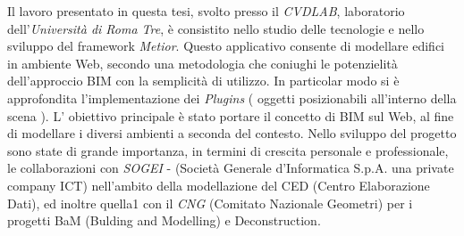 Il lavoro presentato in questa tesi, svolto presso il \emph{CVDLAB},
laboratorio dell'\emph{Università di Roma Tre}, è consistito nello studio delle tecnologie e nello sviluppo del
framework \emph{Metior}.
Questo applicativo consente di modellare edifici in ambiente Web, secondo una metodologia che coniughi le potenzielità
dell’approccio BIM con la semplicità di utilizzo.
In particolar modo si è approfondita l'implementazione dei \emph{Plugins} ( oggetti posizionabili all'interno della scena ).
L' obiettivo principale è stato portare il concetto di BIM sul Web, al fine di modellare i diversi ambienti a seconda del
contesto.
Nello sviluppo del progetto sono state di grande importanza, in termini di crescita personale e professionale,
le collaborazioni con \emph{SOGEI} - (Società Generale d'Informatica S.p.A. una private company ICT)
nell'ambito della modellazione del CED (Centro Elaborazione Dati),
ed inoltre quella1 con il \emph{CNG} (Comitato Nazionale Geometri) per i progetti BaM (Bulding and Modelling) e Deconstruction.
